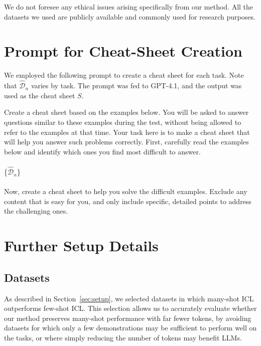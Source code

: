 \documentclass[11pt]{article}
\newcommand{\D}{\mathcal{D}}
\begin{document}
We do not foresee any ethical issues arising specifically from our method.
All the datasets we used are publicly available and commonly used for research purposes.

%


\clearpage
\appendix

\section{Prompt for Cheat-Sheet Creation}
\label{app:cheat_prompt}

We employed the following prompt to create a cheat sheet for each task.
Note that $\hat{\D}_n$ varies by task.
The prompt was fed to GPT-4.1, and the output was used as the cheat sheet $S$.

\begin{tcolorbox}[title=Prompt for Cheat-Sheet Creation, colback=gray!10, colframe=black!70, boxrule=0.5pt, top=0pt, bottom=0pt, left=0pt, right=0pt, arc=0.8mm]
Create a cheat sheet based on the examples below. You will be asked to answer questions similar to these examples during the test, without being allowed to refer to the examples at that time. Your task here is to make a cheat sheet that will help you answer such problems correctly. First, carefully read the examples below and identify which ones you find most difficult to answer.\\\\
\{$\hat{\D}_n$\}\\\\
Now, create a cheat sheet to help you solve the difficult examples. Exclude any content that is easy for you, and only include specific, detailed points to address the challenging ones.
\end{tcolorbox}


\section{Further Setup Details}
\label{app:setup_details}


\subsection{Datasets}
\label{app:datasets}
As described in Section~\ref{sec:setup}, we selected datasets in which many-shot ICL outperforms few-shot ICL.
This selection allows us to accurately evaluate whether our method preserves many-shot performance with far fewer tokens, by avoiding datasets for which only a few demonstrations may be sufficient to perform well on the tasks, or where simply reducing the number of tokens may benefit LLMs.
\end{document}
